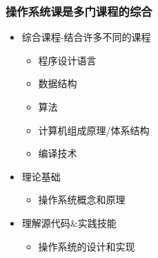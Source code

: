 \begin{frame}
    \frametitle{操作系统课是多门课程的综合}
    \begin{itemize}
        \item 综合课程-结合许多不同的课程
        \begin{itemize}
            \item 程序设计语言
            \item 数据结构
            \item 算法
            \item 计算机组成原理/体系结构
            \item 编译技术
        \end{itemize}        
        \item 理论基础
        \begin{itemize}
            \item 操作系统概念和原理
        \end{itemize}
        \item 理解源代码\&实践技能
        \begin{itemize}
            \item 操作系统的设计和实现
        \end{itemize}
    \end{itemize}
\end{frame}
    
